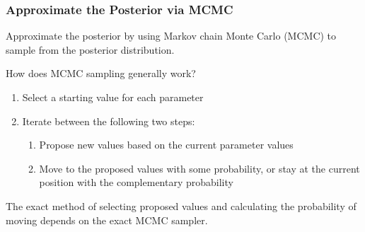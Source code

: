 \documentclass{beamer}
\begin{document}
\begin{frame}
 \frametitle{ Approximate the Posterior  via  MCMC     }

Approximate the posterior by using Markov chain Monte Carlo (MCMC) to sample from the posterior distribution.\\

\pause

\vspace{.5cm}

How does  MCMC sampling generally work?


\begin{enumerate}

\item Select a starting value  for each parameter
\item Iterate between the following two steps:
\begin{enumerate}
\item Propose new  values based on the current parameter values
\item Move to the proposed values with some probability, or stay at the current position with the complementary probability
\end{enumerate}

\end{enumerate}

The exact method of selecting proposed values and calculating the probability of moving depends on the exact MCMC sampler. \\

\end{frame}

%
%
%
%
%
%
\end{document}
